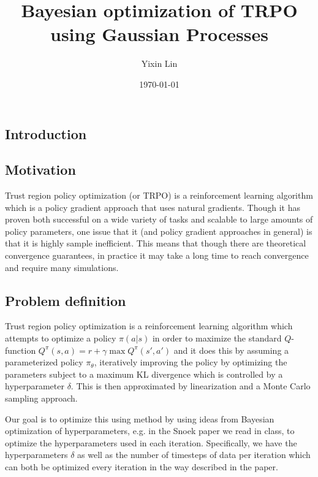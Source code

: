 \documentclass[final]{beamer}
\title
[STAT571 Advanced Machine Learning poster session, April 20, Durham, NC] %
{ %
Bayesian optimization of TRPO using Gaussian Processes
}
\author{ %
Yixin Lin\inst{1}
}
\institute
[Very Large University] %
{
\inst{1} Duke University, Durham NC
}
\date{\today}
\begin{document}
\begin{frame}[t]
\begin{multicols}{3}

\section{Introduction}

\subsection{Motivation}

Trust region policy optimization (or TRPO) is a reinforcement learning algorithm which is a policy gradient approach that uses natural gradients. Though it has proven both successful on a wide variety of tasks and scalable to large amounts of policy parameters, one issue that it (and policy gradient approaches in general) is that it is highly sample inefficient. This means that though there are theoretical convergence guarantees, in practice it may take a long time to reach convergence and require many simulations.

\subsection{Problem definition} 

Trust region policy optimization is a reinforcement learning algorithm which attempts to optimize a policy $ \pi(a|s) $
in order to maximize the standard $Q$-function $ Q^\pi(s,a) = r + \gamma \max Q^\pi(s',a') $
and it does this by assuming a parameterized policy $\pi_\theta$, iteratively improving the policy by optimizing the parameters subject to a maximum KL divergence which is controlled by a hyperparameter $\delta$. This is then approximated by linearization and a Monte Carlo sampling approach.

Our goal is to optimize this using method by using ideas from Bayesian optimization of hyperparameters, e.g. in the Snoek paper we read in class, to optimize the hyperparameters used in each iteration. Specifically, we have the hyperparameters $\delta$ as well as the number of timesteps of data per iteration which can both be optimized every iteration in the way described in the paper.




\end{multicols}
\end{frame}
\end{document}
